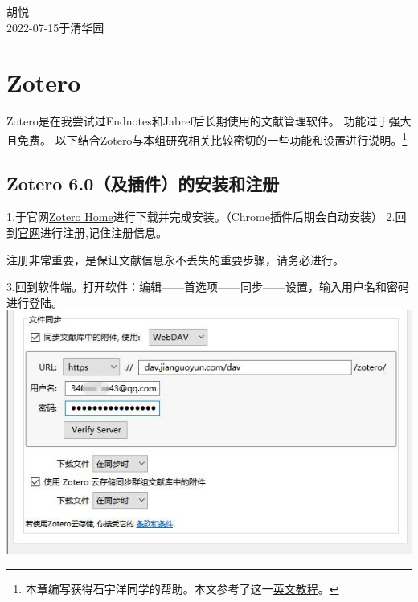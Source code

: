 \documentclass[
  letterpaper,
  DIV=11,
  numbers=noendperiod,
  oneside]{scrreprt}
\begin{document}
胡悦\\
2022-07-15于清华园


\hypertarget{sec-zotero}{%
\chapter{Zotero}\label{sec-zotero}}

Zotero是在我尝试过Endnotes和Jabref后长期使用的文献管理软件。
功能过于强大且免费。
以下结合Zotero与本组研究相关比较密切的一些功能和设置进行说明。\footnote{本章编写获得石宇洋同学的帮助。本文参考了这一\href{https://ikashnitsky.github.io/2019/zotero/}{英文教程}。}

\hypertarget{zotero-6.0ux53caux63d2ux4ef6ux7684ux5b89ux88c5ux548cux6ce8ux518c}{%
\section{Zotero
6.0（及插件）的安装和注册}\label{zotero-6.0ux53caux63d2ux4ef6ux7684ux5b89ux88c5ux548cux6ce8ux518c}}

1.于官网\href{https://www.zotero.org/}{Zotero \textbar{}
Home}进行下载并完成安装。（Chrome插件后期会自动安装）
2.回到\href{https://www.zotero.org/}{官网}进行注册,记住注册信息。

\begin{tcolorbox}[enhanced jigsaw, arc=.35mm, breakable, coltitle=black, colframe=quarto-callout-color-frame, toptitle=1mm, colbacktitle=quarto-callout-color!10!white, leftrule=.75mm, left=2mm, bottomtitle=1mm, rightrule=.15mm, title={Importance}, opacityback=0, bottomrule=.15mm, titlerule=0mm, opacitybacktitle=0.6, colback=white, toprule=.15mm]
注册非常重要，是保证文献信息永不丢失的重要步骤，请务必进行。
\end{tcolorbox}

3.回到软件端。打开软件：编辑------首选项------同步------设置，输入用户名和密码进行登陆。
\includegraphics{./images/zotero_login.jpg}
\end{document}
